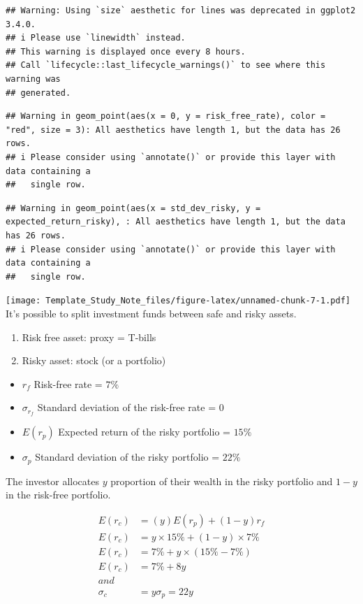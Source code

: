\documentclass[
]{book}
\providecommand{\tightlist}{%
  \setlength{\itemsep}{0pt}\setlength{\parskip}{0pt}}
\begin{document}
\begin{verbatim}
## Warning: Using `size` aesthetic for lines was deprecated in ggplot2 3.4.0.
## i Please use `linewidth` instead.
## This warning is displayed once every 8 hours.
## Call `lifecycle::last_lifecycle_warnings()` to see where this warning was
## generated.
\end{verbatim}

\begin{verbatim}
## Warning in geom_point(aes(x = 0, y = risk_free_rate), color = "red", size = 3): All aesthetics have length 1, but the data has 26 rows.
## i Please consider using `annotate()` or provide this layer with data containing a
##   single row.
\end{verbatim}

\begin{verbatim}
## Warning in geom_point(aes(x = std_dev_risky, y = expected_return_risky), : All aesthetics have length 1, but the data has 26 rows.
## i Please consider using `annotate()` or provide this layer with data containing a
##   single row.
\end{verbatim}

\texttt{[image: Template\_Study\_Note\_files/figure-latex/unnamed-chunk-7-1.pdf]}
It's possible to split investment funds between safe and risky assets.

\begin{enumerate}
\def\labelenumi{\arabic{enumi}.}
\tightlist
\item
  Risk free asset: proxy = T-bills
\item
  Risky asset: stock (or a portfolio)
\end{enumerate}

\begin{itemize}
\tightlist
\item
  \(r_f\) Risk-free rate = \(7\%\)
\item
  \(\sigma_{r_f}\) Standard deviation of the risk-free rate = \(0\)
\item
  \(E(r_p)\) Expected return of the risky portfolio = \(15\%\)
\item
  \(\sigma_p\) Standard deviation of the risky portfolio = \(22\%\)
\end{itemize}

The investor allocates \(y\) proportion of their wealth in the risky
portfolio and \(1 - y\) in the risk-free portfolio.

\[
\begin{aligned}
E(r_c) &= (y)E(r_p) + (1 - y)r_f \\
E(r_c) &= y \times 15\% + (1 - y) \times 7\% \\
E(r_c) &= 7\% + y \times (15\% - 7\%) \\
E(r_c) &= 7\% + 8y \\
and \\
\sigma_c &= y \sigma_𝑝=22𝑦\\
\end{aligned}
\]
\end{document}
